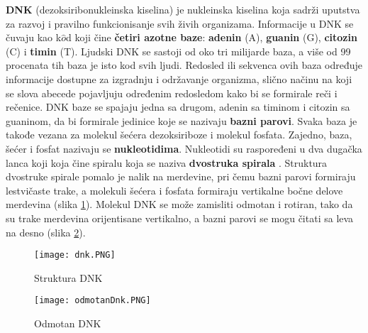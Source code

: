 \documentclass[12pt,oneside]{memoir}
\begin{document}
\begin{comment}
Posle prve rečenice da li ubaciti?
Sva živa bića svoj genetički materijal nose u obliku DNK, sa izuzetkom nekih virusa koji imaju ribonukleinsku kiselinu (RNK).\end{comment}

\textbf{DNK} (dezoksiribonukleinska kiselina) je nukleinska kiselina koja sadrži uputstva za razvoj i pravilno funkcionisanje svih živih organizama. Informacije u DNK se čuvaju kao k$\hat{o}$d koji čine \textbf{četiri azotne baze}: \textbf{adenin} (A), \textbf{guanin} (G), \textbf{citozin} (C) i \textbf{timin} (T). Ljudski DNK se sastoji od oko tri milijarde baza, a više od 99 procenata tih baza je isto kod svih ljudi. Redosled ili sekvenca ovih baza određuje informacije dostupne za izgradnju i održavanje organizma, slično načinu na koji se slova abecede pojavljuju određenim redosledom kako bi se formirale reči i rečenice. DNK baze se spajaju jedna sa drugom, adenin sa timinom i citozin sa guaninom, da bi formirale jedinice koje se nazivaju \textbf{bazni parovi}. Svaka baza je takođe vezana za molekul šećera dezoksiriboze i molekul fosfata. Zajedno, baza, šećer i fosfat nazivaju se \textbf{nukleotidima}. Nukleotidi su raspoređeni u dva dugačka lanca koji koja čine spiralu koja se naziva \textbf{dvostruka spirala} \cite{DNA}. Struktura dvostruke spirale pomalo je nalik na merdevine, pri čemu bazni parovi formiraju lestvičaste trake, a molekuli šećera i fosfata formiraju vertikalne bočne delove merdevina (slika \ref{fig:00}). Molekul DNK se može zamisliti odmotan i rotiran, tako da su trake merdevina orijentisane vertikalno, a bazni parovi se mogu čitati sa leva na desno (slika \ref{fig:odmotanDnk}).

\begin{figure}[!ht]
  \centering
  \texttt{[image: dnk.PNG]}
  \caption{Struktura DNK \cite{DNA}}
  \label{fig:00}
\end{figure}

\begin{figure}[!ht]
  \centering
  \texttt{[image: odmotanDnk.PNG]}
  \caption{Odmotan DNK \cite{DNA2}}
  \label{fig:odmotanDnk}
\end{figure}
\end{document}
